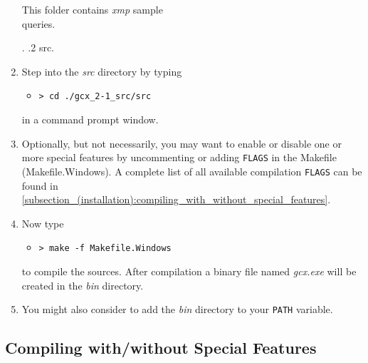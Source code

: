 \begin{enumerate}
{{{       \begin{minipage}[t]{8cm}
         This folder contains \emph{xmp} sample \\ queries. \\
       \end{minipage}}.
  .2 src.
}}
  \item Step into the \emph{src} directory by typing
        \begin{itemize}
          \setlength{\itemsep}{0pt}
          \item[] \texttt{> cd ./gcx\_2-1\_src/src}
        \end{itemize}
        \noindent in a command prompt window.
  \item Optionally, but not necessarily, you may want to enable or disable one or more special features by uncommenting or adding \texttt{FLAGS} in the Makefile (Makefile.Windows). A complete list of all available compilation \texttt{FLAGS} can be found in \autoref{subsection_(installation):compiling_with_without_special_features}.
      \clearpage
  \item Now type
        \begin{itemize}
          \setlength{\itemsep}{0pt}
          \item[] \texttt{> make -f Makefile.Windows}
        \end{itemize}
        \noindent to compile the sources. After compilation a binary file named \emph{gcx.exe} will be created in the \emph{bin} directory.
  \item You might also consider to add the \emph{bin} directory to your \texttt{PATH} variable.
\end{enumerate}

\subsection{Compiling with/without Special Features}
\label{subsection_(installation):compiling_with_without_special_features}

